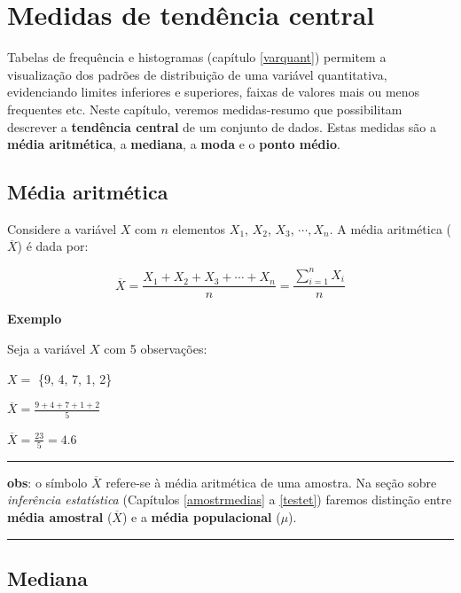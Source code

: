 \documentclass[
]{book}
\begin{document}
\hypertarget{tendcentral}{%
\chapter{Medidas de tendência central}\label{tendcentral}}

Tabelas de frequência e histogramas (capítulo \ref{varquant}) permitem a visualização dos padrões de distribuição de uma variável quantitativa, evidenciando limites inferiores e superiores, faixas de valores mais ou menos frequentes etc. Neste capítulo, veremos medidas-resumo que possibilitam descrever a \textbf{tendência central} de um conjunto de dados. Estas medidas são a \textbf{média aritmética}, a \textbf{mediana}, a \textbf{moda} e o \textbf{ponto médio}.

\hypertarget{muxe9dia-aritmuxe9tica}{%
\section{Média aritmética}\label{muxe9dia-aritmuxe9tica}}

Considere a variável \(X\) com \(n\) elementos \(X_1\), \(X_2\), \(X_3\), \(\cdots, X_n\). A média aritmética (\(\overline{X}\)) é dada por:

\[\overline{X}=\frac{X_1+X_2+X_3+\cdots+X_n}{n}=\frac{\sum_{i=1}^n{X_i}}{n}\]

\textbf{Exemplo}

Seja a variável \(X\) com 5 observações:

\(X =\) \{9, 4, 7, 1, 2\}

\(\overline{X}=\frac{9 + 4 + 7 + 1 + 2}{5}\)

\(\overline{X}=\frac{23}{5} = 4.6\)

\begin{center}\rule{0.5\linewidth}{0.5pt}\end{center}

\textbf{obs}: o símbolo \(\overline{X}\) refere-se à média aritmética de uma amostra. Na seção sobre \emph{inferência estatística} (Capítulos \ref{amostrmedias} a \ref{testet}) faremos distinção entre \textbf{média amostral} (\(\overline{X}\)) e a \textbf{média populacional} (\(\mu\)).

\begin{center}\rule{0.5\linewidth}{0.5pt}\end{center}

\hypertarget{mediana}{%
\section{Mediana}\label{mediana}}
\end{document}
